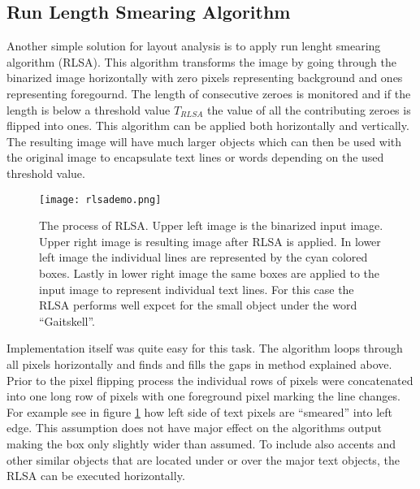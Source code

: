 \documentclass{article}
\begin{document}
        \subsection{Run Length Smearing Algorithm}
          Another simple solution for layout analysis is to apply run lenght smearing algorithm (RLSA). This algorithm transforms the image by going through the binarized image horizontally with zero pixels representing background and ones representing foregournd. The length of consecutive zeroes is monitored and if the length is below a threshold value $T_{RLSA}$ the value of all the contributing zeroes is flipped into ones. This algorithm can be applied both horizontally and vertically. The resulting image will have much larger objects which can then be used with the original image to encapsulate text lines or words depending on the used threshold value.

          \begin{figure}[!ht]
            \centering
            \texttt{[image: rlsademo.png]}
            \caption{The process of RLSA. Upper left image is the binarized input image. Upper right image is resulting image after RLSA is applied. In lower left image the individual lines are represented by the cyan colored boxes. Lastly in lower right image the same boxes are applied to the input image to represent individual text lines. For this case the RLSA performs well expcet for the small object under the word ``Gaitskell''. \label{fig:workingrlsa} }
          \end{figure}

          Implementation itself was quite easy for this task. The algorithm loops through all pixels horizontally and finds and fills the gaps in method explained above. Prior to the pixel flipping process the individual rows of pixels were concatenated into one long row of pixels with one foreground pixel marking the line changes. For example see in figure \ref{fig:workingrlsa} how left side of text pixels are ``smeared'' into left edge. This assumption does not have major effect on the algorithms output making the box only slightly wider than assumed. To include also accents and other similar objects that are located under or over the major text objects, the RLSA can be executed horizontally.
\end{document}
